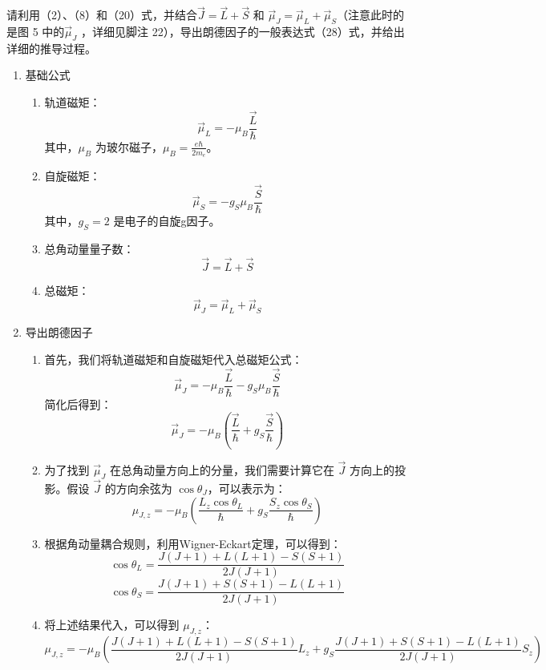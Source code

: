 \documentclass[dvipsnames, svgnames,a4paper,11pt]{article}
\begin{document}
	
	\begin{question}
		请利用（2）、（8）和（20）式，并结合$\vec{J} = \vec{L} + \vec{S}$ 和 $\vec{\mu}_J = \vec{\mu}_L + \vec{\mu}_S $（注意此时的是图 5 中的$\vec{\mu}_J$ ，详细见脚注 22），导出朗德因子的一般表达式（28）式，并给出详细的推导过程。
	\end{question}
	\begin{enumerate}
		\item 基础公式
		\begin{enumerate}
			\item 轨道磁矩：
			\[
			\vec{\mu}_L = -\mu_B \frac{\vec{L}}{\hbar}
			\]
			其中，\(\mu_B\) 为玻尔磁子，\(\mu_B = \frac{e\hbar}{2m_e}\)。
			
			\item 自旋磁矩：
			\[
			\vec{\mu}_S = -g_S \mu_B \frac{\vec{S}}{\hbar}
			\]
			其中，\(g_S = 2\) 是电子的自旋g因子。
			
			\item 总角动量量子数：
			\[
			\vec{J} = \vec{L} + \vec{S}
			\]
			
			\item 总磁矩：
			\[
			\vec{\mu}_J = \vec{\mu}_L + \vec{\mu}_S
			\]
		\end{enumerate}
		
		\item 导出朗德因子
		\begin{enumerate}
			\item 首先，我们将轨道磁矩和自旋磁矩代入总磁矩公式：
			\[
			\vec{\mu}_J = -\mu_B \frac{\vec{L}}{\hbar} - g_S \mu_B \frac{\vec{S}}{\hbar}
			\]
			简化后得到：
			\[
			\vec{\mu}_J = -\mu_B \left( \frac{\vec{L}}{\hbar} + g_S \frac{\vec{S}}{\hbar} \right)
			\]
			
			\item 为了找到 \(\vec{\mu}_J\) 在总角动量方向上的分量，我们需要计算它在 \(\vec{J}\) 方向上的投影。假设 \(\vec{J}\) 的方向余弦为 \(\cos \theta_J\)，可以表示为：
			\[
			\mu_{J,z} = -\mu_B \left( \frac{L_z \cos \theta_L}{\hbar} + g_S \frac{S_z \cos \theta_S}{\hbar} \right)
			\]
			
			\item 根据角动量耦合规则，利用Wigner-Eckart定理，可以得到：
			\[
			\cos \theta_L = \frac{J(J+1) + L(L+1) - S(S+1)}{2J(J+1)}
			\]
			\[
			\cos \theta_S = \frac{J(J+1) + S(S+1) - L(L+1)}{2J(J+1)}
			\]
			
			\item 将上述结果代入，可以得到 \(\mu_{J,z}\)：
			\[
			\mu_{J,z} = -\mu_B \left( \frac{J(J+1) + L(L+1) - S(S+1)}{2J(J+1)} L_z + g_S \frac{J(J+1) + S(S+1) - L(L+1)}{2J(J+1)} S_z \right)
			\]
			

\end{enumerate}
\end{enumerate}
\end{document}

